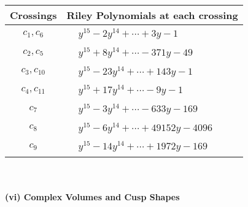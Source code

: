 \documentclass[1p]{elsarticle_modified}
\theoremstyle{definition}
\begin{document}
\begin{tabular}{m{50pt}|m{274pt}}
Crossings & \hspace{64pt}Riley Polynomials at each crossing \\
\hline $$\begin{aligned}c_{1},c_{6}\end{aligned}$$&$\begin{aligned}
&y^{15}-2 y^{14}+\cdots+3 y-1
\end{aligned}$\\
\hline $$\begin{aligned}c_{2},c_{5}\end{aligned}$$&$\begin{aligned}
&y^{15}+8 y^{14}+\cdots-371 y-49
\end{aligned}$\\
\hline $$\begin{aligned}c_{3},c_{10}\end{aligned}$$&$\begin{aligned}
&y^{15}-23 y^{14}+\cdots+143 y-1
\end{aligned}$\\
\hline $$\begin{aligned}c_{4},c_{11}\end{aligned}$$&$\begin{aligned}
&y^{15}+17 y^{14}+\cdots-9 y-1
\end{aligned}$\\
\hline $$\begin{aligned}c_{7}\end{aligned}$$&$\begin{aligned}
&y^{15}-3 y^{14}+\cdots-633 y-169
\end{aligned}$\\
\hline $$\begin{aligned}c_{8}\end{aligned}$$&$\begin{aligned}
&y^{15}-6 y^{14}+\cdots+49152 y-4096
\end{aligned}$\\
\hline $$\begin{aligned}c_{9}\end{aligned}$$&$\begin{aligned}
&y^{15}-14 y^{14}+\cdots+1972 y-169
\end{aligned}$\\
\hline
\end{tabular}\\~\\
\newpage\flushleft \textbf{(vi) Complex Volumes and Cusp Shapes}
\end{document}
